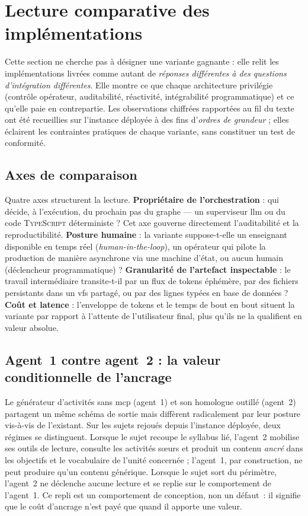 \section{Lecture comparative des implémentations}
\label{sec:comparatif}

Cette section ne cherche pas à désigner une variante gagnante : elle
relit les implémentations livrées comme autant de \emph{réponses
différentes à des questions d'intégration différentes}. Elle montre
ce que chaque architecture privilégie (contrôle opérateur,
auditabilité, réactivité, intégrabilité programmatique) et ce qu'elle
paie en contrepartie. Les observations chiffrées rapportées au fil du
texte ont été recueillies sur l'instance déployée à des fins
d'\emph{ordres de grandeur} ; elles éclairent les contraintes
pratiques de chaque variante, sans constituer un test de conformité.

\subsection{Axes de comparaison}
\label{sec:axes-compar}

Quatre axes structurent la lecture. \textbf{Propriétaire de
l'orchestration} : qui décide, à l'exécution, du prochain pas du
graphe — un superviseur \gls{llm} ou du code \textsc{TypeScript}
déterministe ? Cet axe gouverne directement l'auditabilité et la
reproductibilité. \textbf{Posture humaine} : la variante suppose-t-elle
un enseignant disponible en temps réel (\emph{human-in-the-loop}),
un opérateur qui pilote la production de manière asynchrone via une
machine d'état, ou aucun humain (déclencheur programmatique) ?
\textbf{Granularité de l'artefact inspectable} : le travail
intermédiaire transite-t-il par un flux de tokens éphémère, par des
fichiers persistants dans un \gls{vfs} partagé, ou par des lignes
typées en base de données ? \textbf{Coût et latence} : l'enveloppe
de tokens et le temps de bout en bout situent la variante par
rapport à l'attente de l'utilisateur final, plus qu'ils ne la
qualifient en valeur absolue.

\subsection{Agent~1 contre agent~2 : la valeur conditionnelle de l'ancrage}
\label{sec:a1-vs-a2}

Le générateur d'activités sans \gls{mcp} (agent~1) et son homologue
outillé (agent~2) partagent un même schéma de sortie mais diffèrent
radicalement par leur posture vis-à-vis de l'existant. Sur les sujets
rejoués depuis l'instance déployée, deux régimes se distinguent.
Lorsque le sujet recoupe le syllabus lié, l'agent~2 mobilise ses
outils de lecture, consulte les activités sœurs et produit un contenu
\emph{ancré} dans les objectifs et le vocabulaire de l'unité
concernée ; l'agent~1, par construction, ne peut produire qu'un
contenu générique. Lorsque le sujet sort du périmètre, l'agent~2
ne déclenche aucune lecture et se replie sur le comportement de
l'agent~1. Ce repli est un comportement de conception, non un
défaut~: il signifie que le coût d'ancrage n'est payé que quand il
apporte une valeur.


